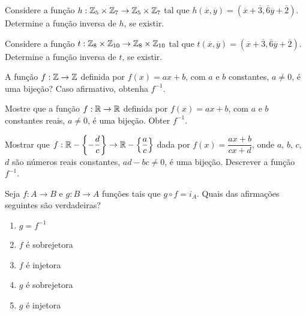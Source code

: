 \documentclass[12pt]{exam}
\begin{document}
\vspace{.3cm}

\questao{} Considere a fun{\c c}{\~a}o $h : \mathbb{Z}_5 \times \mathbb{Z}_7 \to \mathbb{Z}_5 \times \mathbb{Z}_7$ tal que $h(\overline{x},\overline{y}) = (\overline{x} + \overline{3}, \overline{6}\overline{y} + \overline{2})$. Determine a fun\c{c}\~ao inversa de $h$, se existir.

\vspace{.3cm}

\questao{} Considere a fun{\c c}{\~a}o $t : \mathbb{Z}_8 \times \mathbb{Z}_{10} \to \mathbb{Z}_8 \times \mathbb{Z}_{10}$ tal que $t(\overline{x},\overline{y}) = (\overline{x} + \overline{3}, \overline{6}\overline{y} + \overline{2})$. Determine a fun\c{c}\~ao inversa de $t$, se existir.

\vspace{.3cm}

\questao{} A fun{\c c}{\~a}o $f : \mathbb{Z} \to \mathbb{Z}$ definida por $f(x) = ax + b$, com $a$ e $b$ constantes, $a \ne 0$, {\'e} uma bije{\c c}{\~a}o? Caso afirmativo, obtenha $f^{-1}$.

\vspace{.3cm}


\questao{} Mostre que a fun{\c c}{\~a}o $f : \mathbb{R} \to \mathbb{R}$ definida por $f(x) = ax + b$, com $a$ e $b$ constantes reais, $a \ne 0$, {\'e} uma bije{\c c}{\~a}o. Obter $f^{-1}$.

\vspace{.3cm}

\questao{} Mostrar que $f : \mathbb{R} - \left\{-\dfrac{d}{c}\right\} \to \mathbb{R}  - \left\{\dfrac{a}{c}\right\}$ dada por $f(x) =  \dfrac{ax + b}{cx + d}$, onde $a$, $b$, $c$, $d$ s{\~a}o n{\'u}meros reais constantes, $ad - bc \ne 0$, {\'e} uma bije{\c c}{\~a}o. Descrever a fun{\c c}{\~a}o $f^{-1}$.

\vspace{.3cm}

\questao{} Seja $f : A \to B$ e $g : B \to A$ fun\c{c}\~oes tais que $g \circ f = i_A$. Quais das afirma\c{c}\~oes seguintes s\~ao verdadeiras?
\begin{enumerate}[label={\alph*})]
    \item $g = f^{-1}$
    \item $f$ \'e sobrejetora
    \item $f$ \'e injetora
    \item $g$ \'e sobrejetora
    \item $g$ \'e injetora
\end{enumerate}

\vspace{.3cm}
\end{document}
